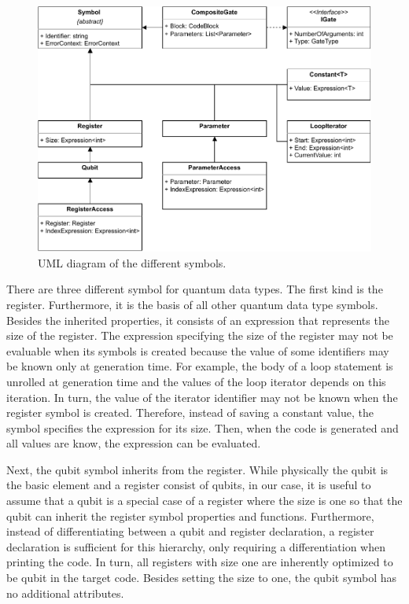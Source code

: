 \begin{figure}[htp]
    \centering
    \includegraphics[width=.9\textwidth]{../figures/drawio/uml_symbols.pdf}
    \caption{UML diagram of the different symbols.}
    \label{fig:implementation_uml_symbols}
\end{figure}

There are three different symbol for quantum data types. The first kind is the register. Furthermore, it is the basis of all other quantum data type symbols. Besides the inherited properties, it consists of an expression that represents the size of the register. The expression specifying the size of the register may not be evaluable when its symbols is created because the value of some identifiers may be known only at generation time.
For example, the body of a loop statement is unrolled at generation time and the values of the loop iterator depends on this iteration. In turn, the value of the iterator identifier may not be known when the register symbol is created. Therefore, instead of saving a constant value, the symbol specifies the expression for its size. Then, when the code is generated and all values are know, the expression can be evaluated.    

Next, the qubit symbol inherits from the register. While physically the qubit is the basic element and a register consist of qubits, in our case, it is useful to assume that a qubit is a special case of a register where the size is one so that the qubit can inherit the register symbol properties and functions. Furthermore, instead of differentiating between a qubit and register declaration, a register declaration is sufficient for this hierarchy, only requiring a differentiation when printing the code. In turn, all registers with size one are inherently optimized to be qubit in the target code. Besides setting the size to one, the qubit symbol has no additional attributes.

